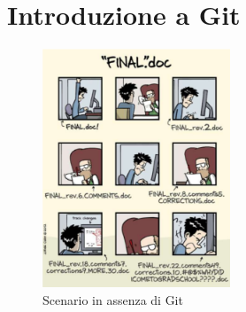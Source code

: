 \documentclass[12pt]{article}
\begin{document}
    \newpage
    \section{Introduzione a Git}
    \begin{figure}[h]
        \centering
        \includegraphics[width=0.5\textwidth]{introduzione_a_git/no_git_example.png}
        \caption{Scenario in assenza di Git}
        \label{fig:no_git_example}
    \end{figure}
\end{document}
